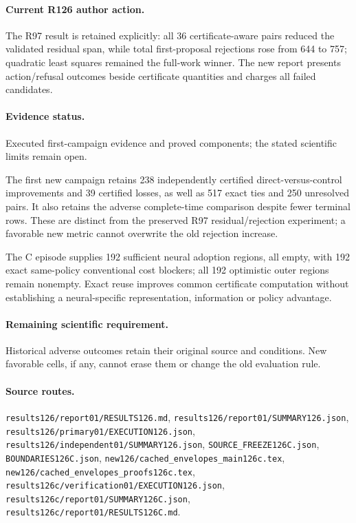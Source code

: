\paragraph{Current R126 author action.} The R97 result is retained explicitly: all 36 certificate-aware pairs reduced the validated residual span, while total first-proposal rejections rose from 644 to 757; quadratic least squares remained the full-work winner. The new report presents action/refusal outcomes beside certificate quantities and charges all failed candidates.

\paragraph{Evidence status.} Executed first-campaign evidence and proved components; the stated scientific limits remain open.

The first new campaign retains 238 independently certified direct-versus-control improvements and 39 certified losses, as well as 517 exact ties and 250 unresolved pairs. It also retains the adverse complete-time comparison despite fewer terminal rows. These are distinct from the preserved R97 residual/rejection experiment; a favorable new metric cannot overwrite the old rejection increase.\par
The C episode supplies 192 sufficient neural adoption regions, all empty, with 192 exact same-policy conventional cost blockers; all 192 optimistic outer regions remain nonempty. Exact reuse improves common certificate computation without establishing a neural-specific representation, information or policy advantage.\par

\paragraph{Remaining scientific requirement.} Historical adverse outcomes retain their original source and conditions. New favorable cells, if any, cannot erase them or change the old evaluation rule.

\paragraph{Source routes.} \nolinkurl{results126/report01/RESULTS126.md}, \nolinkurl{results126/report01/SUMMARY126.json}, \nolinkurl{results126/primary01/EXECUTION126.json}, \nolinkurl{results126/independent01/SUMMARY126.json}, \nolinkurl{SOURCE_FREEZE126C.json}, \nolinkurl{BOUNDARIES126C.json}, \nolinkurl{new126/cached_envelopes_main126c.tex}, \nolinkurl{new126/cached_envelopes_proofs126c.tex}, \nolinkurl{results126c/verification01/EXECUTION126.json}, \nolinkurl{results126c/report01/SUMMARY126C.json}, \nolinkurl{results126c/report01/RESULTS126C.md}.

